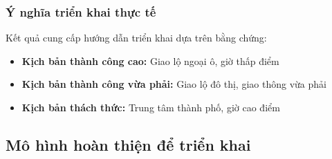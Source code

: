 \subsubsection{Ý nghĩa triển khai thực tế}
Kết quả cung cấp hướng dẫn triển khai dựa trên bằng chứng:
\begin{itemize}
    \item \textbf{Kịch bản thành công cao:} Giao lộ ngoại ô, giờ thấp điểm
    \item \textbf{Kịch bản thành công vừa phải:} Giao lộ đô thị, giao thông vừa phải
    \item \textbf{Kịch bản thách thức:} Trung tâm thành phố, giờ cao điểm
\end{itemize}




\subsection{Mô hình hoàn thiện để triển khai}

